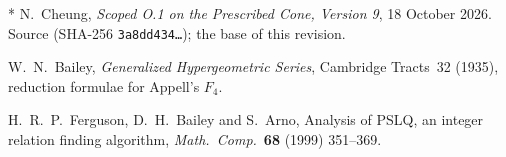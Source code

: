 * N.~Cheung,
\emph{Scoped O.1 on the Prescribed Cone, Version 9},
18 October 2026. Source 
(SHA-256 \texttt{3a8dd434\ldots}); the base of this revision.

\dag{} W.~N.~Bailey, \emph{Generalized Hypergeometric Series},
Cambridge Tracts~32 (1935), reduction formulae for Appell's \(F_4\).

\dag{} H.~R.~P.~Ferguson, D.~H.~Bailey and S.~Arno,
Analysis of PSLQ, an integer relation finding algorithm,
\emph{Math.\ Comp.}\ \textbf{68} (1999) 351--369.

